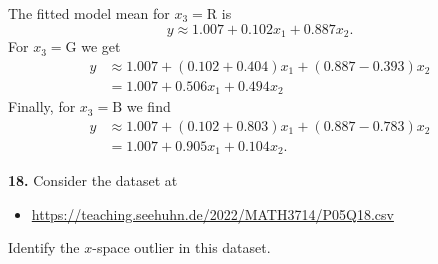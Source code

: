 \documentclass[
  a4paper,
]{article}
\providecommand{\tightlist}{%
  \setlength{\itemsep}{0pt}\setlength{\parskip}{0pt}}
\theoremstyle{definition}
\theoremstyle{definition}
\theoremstyle{definition}
\theoremstyle{definition}
\theoremstyle{remark}
\begin{document}
\begin{myanswers}
The fitted model mean for \(x_3 = \mathrm{R}\) is
\begin{equation*}
  y
  \approx 1.007 + 0.102 x_1 + 0.887 x_2.
\end{equation*}
For \(x_3 = \mathrm{G}\) we get
\begin{align*}
  y
  &\approx 1.007 + (0.102 + 0.404) x_1 + (0.887 - 0.393) x_2 \\
  &= 1.007 + 0.506 x_1 + 0.494 x_2
\end{align*}
Finally, for \(x_3 = \mathrm{B}\) we find
\begin{align*}
  y
  &\approx 1.007 + (0.102 + 0.803) x_1 + (0.887 - 0.783) x_2 \\
  &= 1.007 + 0.905 x_1 + 0.104 x_2.
\end{align*}

\end{myanswers}

\textbf{18.}
Consider the dataset at

\begin{itemize}
\tightlist
\item
  \url{https://teaching.seehuhn.de/2022/MATH3714/P05Q18.csv}
\end{itemize}

Identify the \(x\)-space outlier in this dataset.
\end{document}
